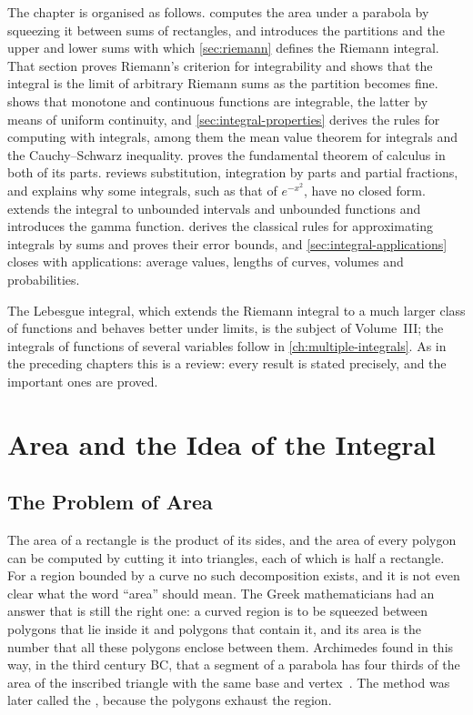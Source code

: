 The chapter is organised as follows.  computes the area under a parabola by squeezing it between sums of rectangles, and introduces the partitions and the upper and lower sums with which \cref{sec:riemann} defines the Riemann integral. That section proves Riemann's criterion for integrability and shows that the integral is the limit of arbitrary Riemann sums as the partition becomes fine.  shows that monotone and continuous functions are integrable, the latter by means of uniform continuity, and \cref{sec:integral-properties} derives the rules for computing with integrals, among them the mean value theorem for integrals and the Cauchy--Schwarz inequality.  proves the fundamental theorem of calculus in both of its parts.  reviews substitution, integration by parts and partial fractions, and explains why some integrals, such as that of $e^{-x^2}$, have no closed form.  extends the integral to unbounded intervals and unbounded functions and introduces the gamma function.  derives the classical rules for approximating integrals by sums and proves their error bounds, and \cref{sec:integral-applications} closes with applications: average values, lengths of curves, volumes and probabilities.

The Lebesgue integral, which extends the Riemann integral to a much larger class of functions and behaves better under limits, is the subject of Volume~III; the integrals of functions of several variables follow in \cref{ch:multiple-integrals}. As in the preceding chapters this is a review: every result is stated precisely, and the important ones are proved.

\section{Area and the Idea of the Integral}
\label{sec:area}

\subsection{The Problem of Area}

The area of a rectangle is the product of its sides, and the area of every polygon can be computed by cutting it into triangles, each of which is half a rectangle. For a region bounded by a curve no such decomposition exists, and it is not even clear what the word ``area'' should mean. The Greek mathematicians had an answer that is still the right one: a curved region is to be squeezed between polygons that lie inside it and polygons that contain it, and its area is the number that all these polygons enclose between them. Archimedes found in this way, in the third century BC, that a segment of a parabola has four thirds of the area of the inscribed triangle with the same base and vertex~\cite{heath1897archimedes,edwards1979}. The method was later called the , because the polygons exhaust the region.

